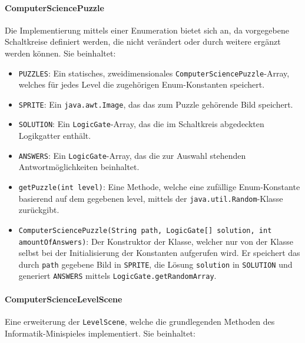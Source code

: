 \paragraph{ComputerSciencePuzzle} Die Implementierung mittels einer Enumeration bietet sich an, da vorgegebene Schaltkreise definiert werden, die nicht verändert oder durch weitere ergänzt werden können.
Sie beinhaltet:

\begin{sloppypar}
    \begin{itemize}
        \item \texttt{PUZZLES}: Ein statisches, zweidimensionales \texttt{ComputerSciencePuzzle}-Array, welches für jedes Level die zugehörigen Enum-Konstanten speichert.
        \item \texttt{SPRITE}: Ein \texttt{java.awt.Image}, das das zum Puzzle gehörende Bild speichert.
        \item \texttt{SOLUTION}: Ein \texttt{LogicGate}-Array, das die im Schaltkreis abgedeckten Logikgatter enthält.
        \item \texttt{ANSWERS}: Ein \texttt{LogicGate}-Array, das die zur Auswahl stehenden Antwortmöglichkeiten beinhaltet.
        \item \texttt{getPuzzle(int level)}: Eine Methode, welche eine zufällige Enum-Konstante basierend auf dem gegebenen level, mittels der \texttt{java.util.Random}-Klasse zurückgibt.
        \item \texttt{ComputerSciencePuzzle(String path, LogicGate[] solution, int amountOfAnswers)}: Der Konstruktor der Klasse, welcher nur von der Klasse selbst bei der Initialisierung der Konstanten aufgerufen wird.
            Er speichert das durch \texttt{path} gegebene Bild in \texttt{SPRITE}, die Lösung \texttt{solution} in \texttt{SOLUTION} und generiert \texttt{ANSWERS} mittels \texttt{LogicGate.getRandomArray}.
    \end{itemize}
\end{sloppypar}

\paragraph{ComputerScienceLevelScene} Eine erweiterung der \texttt{LevelScene}, welche die grundlegenden Methoden des Informatik-Minispieles implementiert.
Sie beinhaltet:

